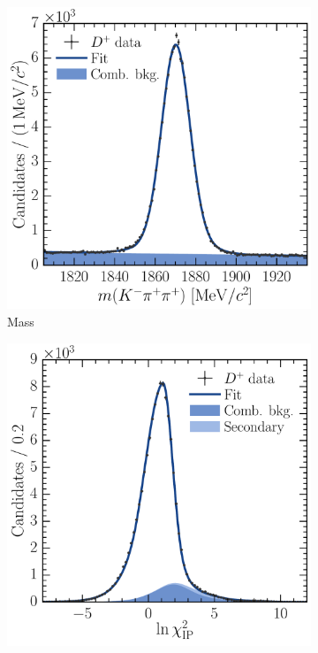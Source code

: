 \begin{figure}
  \begin{subfigure}[b]{0.5\textwidth}
    \centering
    \includegraphics[width=\textwidth]{figures/production/fitting/DpToKpipi_mass_fit_pT_4_y_2}
    \caption{Mass}
    \label{fig:prod:fitting:DpToKpipi:mass_high_sig}
  \end{subfigure}
  \begin{subfigure}[b]{0.5\textwidth}
    \centering
    \includegraphics[width=\textwidth]{figures/production/fitting/DpToKpipi_ipchisq_fit_pT_4_y_2}

\end{subfigure}
\end{figure}
